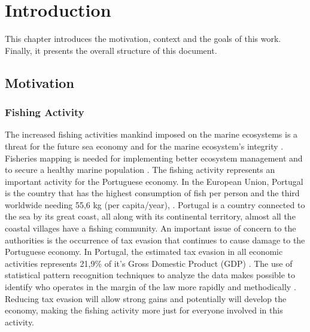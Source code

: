 

% 
% 
%
\chapter{Introduction}
\label{cha:introduction}
This chapter introduces the motivation, context and the goals of this work. Finally, it presents the overall structure of this document.

\section{Motivation} %
\label{sec:motivation}

\subsection{Fishing Activity} %
\label{sub:fishing_activity}
The increased fishing activities mankind imposed on the marine ecosystems is a threat for the future sea economy and for the marine ecosystem's integrity \cite{AgardyEffects}.\\
Fisheries mapping is needed for implementing better ecosystem management and to secure a healthy marine population \cite{AlfredImperative}.
The fishing activity represents an important activity for the Portuguese economy. In the European Union, Portugal is the country that has the highest consumption of fish per person and the third worldwide needing 55,6 kg (per capita/year), \cite{WEBSITE:ConsumoPescasPortugal}. Portugal is a country connected to the sea by its great coast, all along with its continental territory, almost all the coastal villages have a fishing community.
An important issue of concern to the authorities is the occurrence of tax evasion that continues to cause damage to the Portuguese economy. In Portugal, the estimated tax evasion in all economic activities represents 21,9\% of it's Gross Domestic Product (GDP) \cite{BOOK:EsbocoFraude}.
The use of statistical pattern recognition techniques to analyze the data makes possible to identify who operates in the margin of the law more rapidly and methodically \cite{ShuklaBigData}. Reducing tax evasion will allow strong gains and potentially will develop the economy, making the fishing activity more just for everyone involved in this activity.

